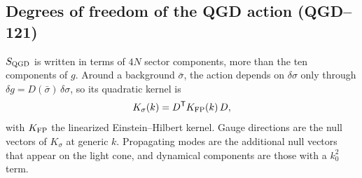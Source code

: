 \documentclass[11pt,a4paper]{article}
\begin{document}
\subsection{Degrees of freedom of the QGD action (QGD--121)}\label{sec:dof}
$S_{\rm QGD}$ is written in terms of $4N$ sector components, more than the ten components of
$g$. Around a background $\bar\sigma$, the action depends on $\delta\sigma$ only through
$\delta g=D(\bar\sigma)\,\delta\sigma$, so its quadratic kernel is
\begin{equation}\label{eq:Ksigma}
K_\sigma(k)=D^{\mathsf T}K_{\rm FP}(k)\,D,
\end{equation}
with $K_{\rm FP}$ the linearized Einstein--Hilbert kernel. Gauge directions are the null
vectors of $K_\sigma$ at generic $k$. Propagating modes are the additional null vectors that
appear on the light cone, and dynamical components are those with a $k_0^2$ term.
\end{document}
